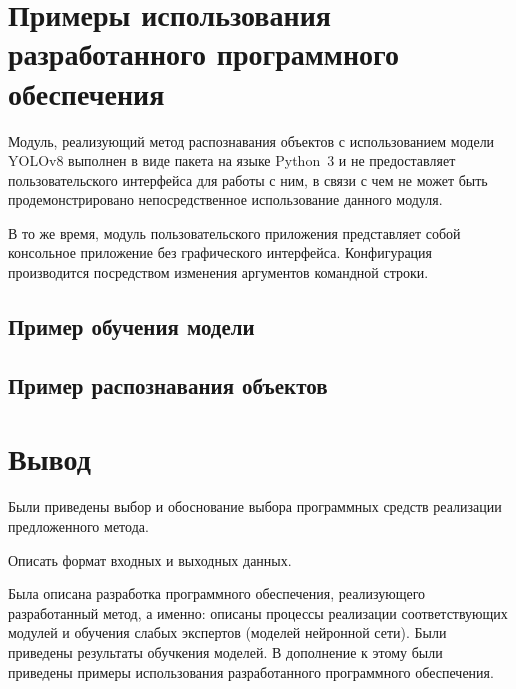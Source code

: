 \section{Примеры использования разработанного программного обеспечения}

Модуль, реализующий метод распознавания объектов с использованием модели YOLOv8 выполнен в виде пакета на языке Python~3 и не предоставляет пользовательского интерфейса для работы с ним, в связи с чем не может быть продемонстрировано непосредственное использование данного модуля.

В то же время, модуль пользовательского приложения представляет собой консольное приложение без графического интерфейса. Конфигурация производится посредством изменения аргументов командной строки.

\subsection{Пример обучения модели}



\subsection{Пример распознавания объектов}



\section{Вывод}

Были приведены выбор и обоснование выбора программных средств реализации предложенного метода.

Описать формат входных и выходных данных.

Была описана разработка программного обеспечения, реализующего разработанный метод, а именно: описаны процессы реализации соответствующих модулей и обучения слабых экспертов (моделей нейронной сети). Были приведены результаты обучкения моделей. В дополнение к этому были приведены примеры использования разработанного программного обеспечения.
